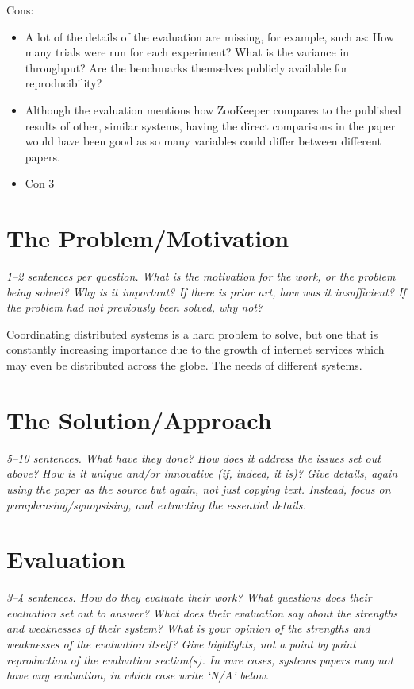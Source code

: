 \documentclass[11pt]{article}
\begin{document}
Cons:

\begin{itemize}

    \item A lot of the details of the evaluation are missing, for example, such
    as: How many trials were run for each experiment? What is the variance in
    throughput? Are the benchmarks themselves publicly available for
    reproducibility?

    \item Although the evaluation mentions how ZooKeeper compares to the
    published results of other, similar systems, having the direct comparisons
    in the paper would have been good as so many variables could differ between
    different papers.

    \item Con 3

\end{itemize}

\section*{The Problem/Motivation}

\textsl{1--2 sentences per question. What is the motivation for the work, or
the problem being solved? Why is it important? If there is prior art, how was
it insufficient? If the problem had not previously been solved, why not?}

Coordinating distributed systems is a hard problem to solve, but one that is
constantly increasing importance due to the growth of internet services which
may even be distributed across the globe. The needs of different systems.

\section*{The Solution/Approach}

\textsl{5--10 sentences. What have they done? How does it address the issues
set out above? How is it unique and/or innovative (if, indeed, it is)? Give
details, again using the paper as the source but again, not just copying text.
Instead, focus on paraphrasing/synopsising, and extracting the essential
details.}


\section*{Evaluation}

\textsl{3--4 sentences. How do they evaluate their work? What questions does
their evaluation set out to answer? What does their evaluation say about the
strengths and weaknesses of their system? What is your opinion of the strengths
and weaknesses of the evaluation itself? Give highlights, not a point by point
reproduction of the evaluation section(s). In rare cases, systems papers may
not have any evaluation, in which case write `N/A' below.}
\end{document}
